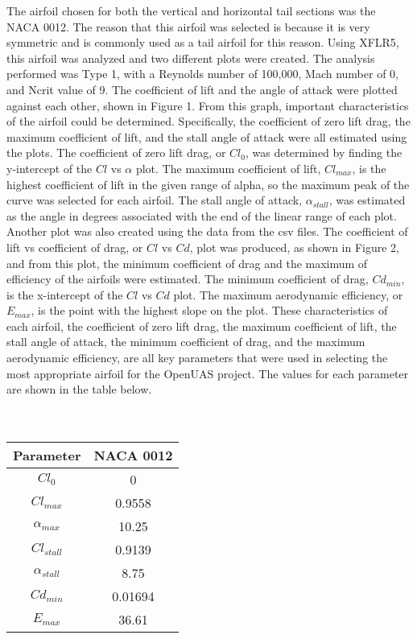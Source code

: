 \documentclass{article}
\begin{document}
The airfoil chosen for both the vertical and horizontal tail sections was the NACA 0012. The reason that this airfoil was selected is because it is very symmetric and is commonly used as a tail airfoil for this reason. Using XFLR5, this airfoil was analyzed and two different plots were created. The analysis performed was Type 1, with a Reynolds number of 100,000, Mach number of 0, and Ncrit value of 9. The coefficient of lift and the angle of attack were plotted against each other, shown in Figure 1. From this graph, important characteristics of the airfoil could be determined. Specifically, the coefficient of zero lift drag, the maximum coefficient of lift, and the stall angle of attack were all estimated using the plots. The coefficient of zero lift drag, or $Cl_{0}$, was determined by finding the y-intercept of the  $Cl$ vs $\alpha$ plot. The maximum coefficient of lift, $Cl_{max}$, is the highest coefficient of lift in the given range of alpha, so the maximum peak of the curve was selected for each airfoil. The stall angle of attack, $\alpha_{stall}$, was estimated as the angle in degrees associated with the end of the linear range of each plot. Another plot was also created using the data from the csv files. The coefficient of lift vs coefficient of drag, or $Cl$ vs $Cd$, plot was produced, as shown in Figure 2, and from this plot, the minimum coefficient of drag and the maximum of efficiency of the airfoils were estimated. The minimum coefficient of drag, $Cd_{min}$, is the x-intercept of the $Cl$ vs $Cd$ plot. The maximum aerodynamic efficiency, or $E_{max}$, is the point with the highest slope on the plot. These characteristics of each airfoil, the coefficient of zero lift drag, the maximum coefficient of lift, the stall angle of attack, the minimum coefficient of drag, and the maximum aerodynamic efficiency, are all key parameters that were used in selecting the most appropriate airfoil for the OpenUAS project. The values for each parameter are shown in the table below.\\\\\\

\begin{tabular}[pos]{| c | c |}


\hline
Parameter & NACA 0012 \\ \hline
$Cl_{0}$& 0 \\ \hline
$Cl_{max}$& 0.9558 \\ \hline
$\alpha_{max}$& 10.25 \\ \hline
$Cl_{stall}$& 0.9139 \\ \hline
$\alpha_{stall}$& 8.75 \\ \hline
$Cd_{min}$& 0.01694 \\ \hline
$E_{max}$& 36.61\\ \hline


\end{tabular}\\\\\\\\\\
\end{document}
